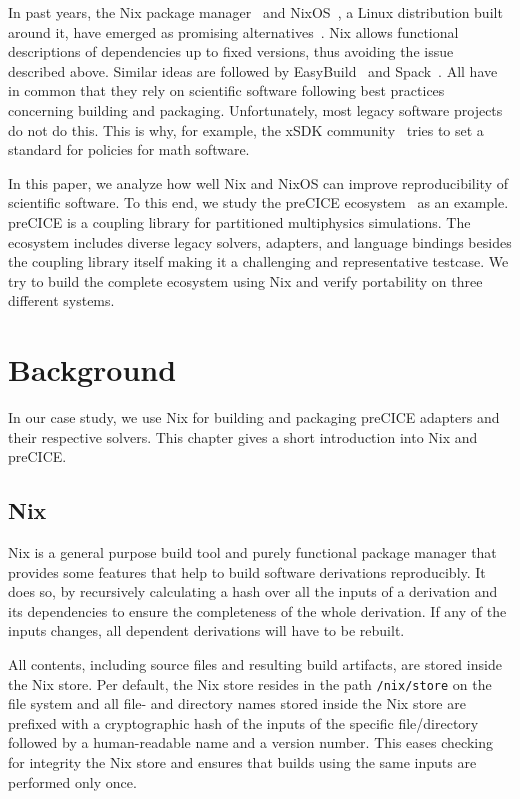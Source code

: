 \documentclass{eceasst}
\begin{document}
In past years, the Nix package manager~\cite{Dolstra_2004} and NixOS~\cite{Dolstra_2010}, a Linux distribution built around it, have emerged as promising alternatives~\cite{Devresse_2015}.
Nix allows functional descriptions of dependencies up to fixed versions, thus avoiding the issue described above.
Similar ideas are followed by EasyBuild~\cite{easybuil6495863} and Spack~\cite{spack7832814}.
All have in common that they rely on scientific software following best practices concerning building and packaging. Unfortunately, most legacy software projects do not do this.
This is why, for example, the xSDK community~\cite{xSDK2023} tries to set a standard for policies for math software.

In this paper, we analyze how well Nix and NixOS can improve reproducibility of scientific software. To this end, we study the preCICE ecosystem~\cite{preCICEv2} as an example. preCICE is a coupling library for partitioned multiphysics simulations. The ecosystem includes diverse legacy solvers, adapters, and language bindings besides the coupling library itself making it a challenging and representative testcase. We try to build the complete ecosystem using Nix and verify portability on three different systems.

\section{Background}

In our case study, we use Nix for building and packaging preCICE adapters and their respective solvers.
This chapter gives a short introduction into Nix and preCICE.

\subsection{Nix}

Nix is a general purpose build tool and purely functional package manager that provides some features that help to build software derivations reproducibly.
It does so, by recursively calculating a hash over all the inputs of a derivation and its dependencies to ensure the completeness of the whole derivation.
If any of the inputs changes, all dependent derivations will have to be rebuilt.

All contents, including source files and resulting build artifacts, are stored inside the Nix store.
Per default, the Nix store resides in the path \texttt{/nix/store} on the file system and all file- and directory names stored inside the Nix store are prefixed with a cryptographic hash of the inputs of the specific file/directory followed by a human-readable name and a version number.
This eases checking for integrity the Nix store and ensures that builds using the same inputs are performed only once.
\end{document}
